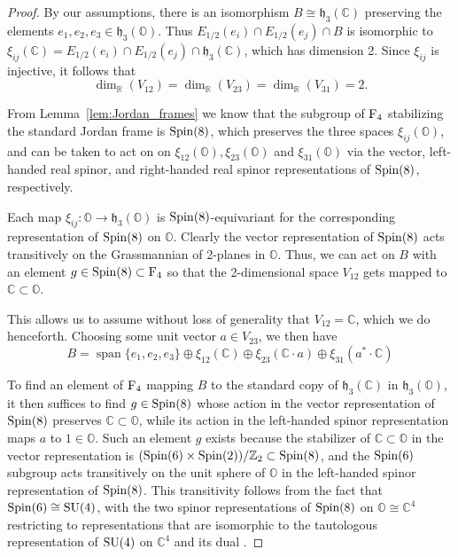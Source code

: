 \documentclass{article}
\theoremstyle{plain}
\theoremstyle{remark}
\theoremstyle{definition}
\newcommand{\spann}{\operatorname{span}} %
\newcommand{\R}{{\mathbb R}}  %
\newcommand{\C}{{\mathbb C}}  %
\newcommand{\Z}{{\mathbb Z}}  %
\renewcommand{\O}{{\mathbb O}}  %
\newcommand{\SU}{{\rm SU}}    %
\newcommand{\Spin}{{\rm Spin}}    %
\newcommand{\F}{{\rm F}}       %
\newcommand{\h}{\mathfrak{h}}  %
\begin{document}
\begin{proof}
By our assumptions, there is an isomorphism $B \cong \h_3(\C)$ preserving the elements $e_1,e_2,e_3 \in \h_3(\O)$.  Thus $E_{1/2}(e_i)\cap E_{1/2}(e_j)\cap B$ is isomorphic to $\xi_{ij}(\C) = E_{1/2}(e_i)\cap E_{1/2}(e_j)\cap\h_3(\C)$, which has dimension 2. Since $\xi_{ij}$ is injective, it follows that
\[
\dim_\R(V_{12}) = \dim_\R(V_{23}) = \dim_\R(V_{31}) = 2 .
\]

From Lemma~\ref{lem:Jordan_frames} we know that the subgroup of $\F_4$ stabilizing the standard Jordan frame is $\Spin(8)$, which preserves the three spaces $\xi_{ij}(\O)$, and can be taken to act on on $\xi_{12}(\O), \xi_{23}(\O)$ and $\xi_{31}(\O)$ via the vector, left-handed real spinor, and right-handed real spinor representations of $\Spin(8)$, respectively. 

Each map $\xi_{ij} \colon \O\to\h_3(\O)$ is $\Spin(8)$-equivariant for the corresponding representation of $\Spin(8)$ on $\O$.  Clearly the vector representation of $\Spin(8)$ acts transitively on the Grassmannian of 2-planes in $\O$.  Thus, we can act on $B$ with an element $g \in \Spin(8) \subset \F_4$ so that the 2-dimensional space $V_{12}$ gets mapped to $\C\subset\O$.  

This allows us to assume without loss of generality that $V_{12}=\C$, which we do henceforth.   Choosing some unit vector $a \in V_{23}$, we then have
\begin{equation}
\label{eq:B_decomposition}
B=\spann\{e_1,e_2,e_3\}\oplus\xi_{12}(\C)\oplus\xi_{23}(\C\cdot a)\oplus\xi_{31}(a^\ast\cdot\C) 
\end{equation}

To find an element of $\F_4$ mapping $B$ to the standard copy of $\h_3(\C)$ in $\h_3(\O)$, it then suffices to find $g \in \Spin(8)$ whose action in the vector representation of $\Spin(8)$ preserves $\C \subset \O$, while its action in the left-handed spinor representation maps $a$ to $1 \in \O$.  Such an element $g$ exists because the stabilizer of $\C \subset \O$ in the vector representation is $(\Spin(6) \times \Spin(2))/\Z_2 \subset \Spin(8)$, and the $\Spin(6)$ subgroup acts transitively on the unit sphere of $\O$ in the left-handed spinor representation of $\Spin(8)$.  This transitivity follows from the fact that $\Spin(6) \cong \SU(4)$, with the two spinor representations of $\Spin(8)$ on $\O \cong \C^4$ restricting to representations that are isomorphic to the tautologous representation of $\SU(4)$ on $\C^4$ and its dual \cite{Adams,Harvey}.
\end{proof}
\end{document}

